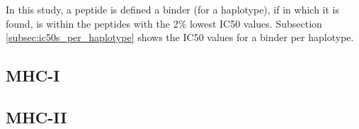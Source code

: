 In this study, a peptide is defined a binder (for a haplotype), 
if  in which it is found, 
is within the peptides with the 2\% lowest IC50 values.
Subsection \ref{subsec:ic50s_per_haplotype} shows the IC50 values
for a binder per haplotype.

\subsection{MHC-I}



%   

%   

\subsection{MHC-II}



%   

%   

